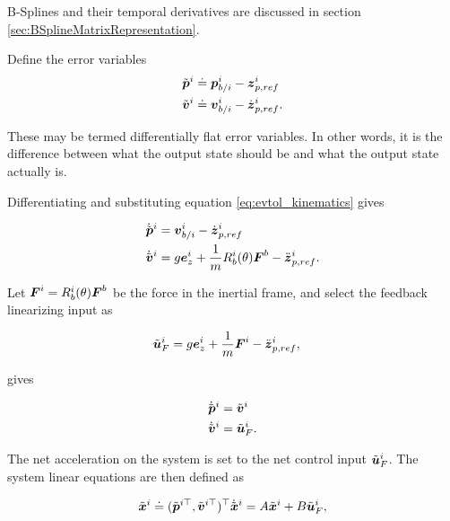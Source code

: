 B-Splines and their temporal derivatives are discussed in section \ref{sec:BSplineMatrixRepresentation}.

Define the error variables
\begin{align*}
    \tilde{\boldsymbol{p}}^i &\doteq \boldsymbol{p}_{b/i}^i-\boldsymbol{z}_{p,ref}^i \\
    \tilde{\boldsymbol{v}}^i &\doteq \boldsymbol{v}_{b/i}^i-\dot{\boldsymbol{z}}_{p,ref}^i.
\end{align*}

These may be termed differentially flat error variables. 
In other words, it is the difference between what the output state should be and what the output state actually is.

Differentiating and substituting equation \ref{eq:evtol_kinematics} gives

\begin{subequations}
\label{eq:error_evolution_1}
\begin{align}
    \dot{\tilde{\boldsymbol{p}}}^i &= \boldsymbol{v}_{b/i}^{i}-\dot{\boldsymbol{z}}_{p,ref}^i \\
    \dot{\tilde{\boldsymbol{v}}}^i &= g \boldsymbol{e}_z^i + \frac{1}{m} R_b^i(\theta) \boldsymbol{F}^b-\ddot{\boldsymbol{z}}_{p,ref}^i.
\end{align}
\end{subequations}


Let $\boldsymbol{F}^i=R_b^i(\theta)\boldsymbol{F}^b$ be the force in the inertial frame, and select the feedback linearizing input as

\begin{subequations}
\label{eq:inputs_feedback_linearization}
\begin{align}
    \tilde{\boldsymbol{u}}_F^i &= g \boldsymbol{e}_z^i + \frac{1}{m} \boldsymbol{F}^i-\ddot{\boldsymbol{z}}_{p,ref}^i,
\end{align}
\end{subequations}

gives

\begin{subequations}
\label{eq:error_evolution_3}
\begin{align}
    \dot{\tilde{\boldsymbol{p}}}^i &= \tilde{\boldsymbol{v}}^i \\
    \dot{\tilde{\boldsymbol{v}}}^i &= \tilde{\boldsymbol{u}}_F^i.
\end{align}
\end{subequations}

The net acceleration on the system is set to the net control input $\tilde{\boldsymbol{u}}_F^i$. 
The system linear equations are then defined as

\begin{align}
    \tilde{\boldsymbol{x}}^i\doteq(\tilde{\boldsymbol{p}}^{i\top}, \tilde{\boldsymbol{v}}^{i\top})^\top
    \dot{\tilde{\boldsymbol{x}}}^i = A\tilde{\boldsymbol{x}}^i + B\tilde{\boldsymbol{u}}_F^i,
\end{align}

